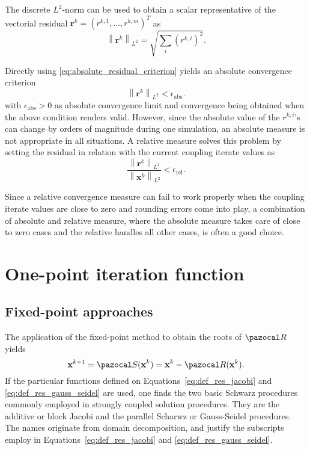 The discrete  $L^{2}$-norm can be used to obtain a scalar representative of the vectorial residual \(\mathbf r^{k}=\left(r^{k,1}, \ldots, r^{k,m}\right)^{T}\) as
\begin{equation} \label{eq:absolute_residual_criterion}
\left\|\mathbf{r}^{k}\right\|_{L^{2}}=\sqrt{\sum_{i}\left(r^{k, i}\right)^{2}}.
\end{equation}

Directly using \eqref{eq:absolute_residual_criterion} yields an absolute convergence criterion
\begin{equation}
\left\|\boldsymbol{r} ^{k}\right\|_{L^{2}}<\epsilon_\mathrm{abs}.
\end{equation}
with $\epsilon_\mathrm{abs}>0$ as absolute convergence limit and convergence being obtained when the above condition renders valid.
However, since the absolute value of the $r^{k,i}$'s can change by orders of magnitude during one simulation, an absolute measure is not appropriate in all situations.
A relative measure solves this problem by setting the residual in relation with the current coupling iterate values as
\begin{equation}
\frac{\left\|\mathbf{r}^{k}\right\|_{L^{2}}}{\left\|\mathbf{x}^{k}\right\|_{L^{2}}}<\epsilon_\mathrm{rel}.
\end{equation}

Since a relative convergence measure can fail to work properly when the coupling iterate values are close to zero and rounding errors come into play, a combination of absolute and relative measure, where the absolute measure takes care of close to zero cases and the relative handles all other cases, is often a good choice.



\section{One-point iteration function}


\subsection{Fixed-point approaches}

The application of the fixed-point method to obtain the roots of \(\pazocal R\) yields
\begin{equation}
  \mathbf x^{k+1} = \pazocal S(\mathbf x^k) = \mathbf x^k - \pazocal R(\mathbf x^k).
\end{equation}
If the particular functions defined on Equations~\eqref{eq:def_res_jacobi} and \eqref{eq:def_res_gauss_seidel} are used, one finds the  two basic Schwarz procedures commonly employed in strongly coupled solution procedures.
They are the additive or block Jacobi and the parallel Scharwz or Gauss-Seidel procedures.
The names originate from domain decomposition, and justify the subscripts employ in Equations~\eqref{eq:def_res_jacobi} and \eqref{eq:def_res_gauss_seidel}.

